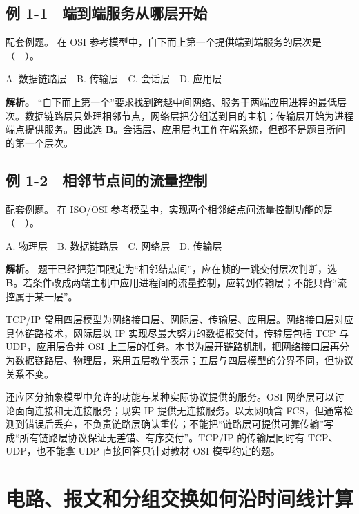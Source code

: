 \subsection{例 1-1　端到端服务从哪层开始}\label{CN01-ex1}

\begin{example}[配套例题]

配套例题。 在 OSI 参考模型中，自下而上第一个提供端到端服务的层次是（　）。

A. 数据链路层　B. 传输层　C. 会话层　D. 应用层

\end{example}

\textbf{解析。} ``自下而上第一个''要求找到跨越中间网络、服务于两端应用进程的最低层次。数据链路层只处理相邻节点，网络层把分组送到目的主机；传输层开始为进程端点提供服务。因此选 \textbf{B}。会话层、应用层也工作在端系统，但都不是题目所问的第一个层次。

\subsection{例 1-2　相邻节点间的流量控制}\label{CN01-ex2}

\begin{example}[配套例题]

配套例题。 在 ISO/OSI 参考模型中，实现两个相邻结点间流量控制功能的是（　）。

A. 物理层　B. 数据链路层　C. 网络层　D. 传输层

\end{example}

\textbf{解析。} 题干已经把范围限定为``相邻结点间''，应在帧的一跳交付层次判断，选 \textbf{B}。若条件改成两端主机中应用进程间的流量控制，应转到传输层；不能只背``流控属于某一层''。

TCP/IP 常用四层模型为网络接口层、网际层、传输层、应用层。网络接口层对应具体链路技术，网际层以 IP 实现尽最大努力的数据报交付，传输层包括 TCP 与 UDP，应用层合并 OSI 上三层的任务。本书为展开链路机制，把网络接口层再分为数据链路层、物理层，采用五层教学表示；五层与四层模型的分界不同，但协议关系不变。

还应区分抽象模型中允许的功能与某种实际协议提供的服务。OSI 网络层可以讨论面向连接和无连接服务；现实 IP 提供无连接服务。以太网帧含 FCS，但通常检测到错误后丢弃，不负责链路层确认重传；不能把``链路层可提供可靠传输''写成``所有链路层协议保证无差错、有序交付''。TCP/IP 的传输层同时有 TCP、UDP，也不能拿 UDP 直接回答只针对教材 OSI 模型约定的题。

\section{电路、报文和分组交换如何沿时间线计算}\label{CN01-07}

